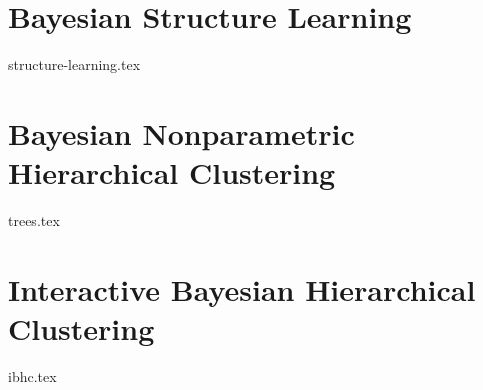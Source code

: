 \chapter{Bayesian Structure Learning}
\label{chap:structure-learning}
{structure-learning.tex}

\chapter{Bayesian Nonparametric Hierarchical Clustering}
\label{chap:bnhc}
{trees.tex}

\chapter{Interactive Bayesian Hierarchical Clustering}
\label{chap:ibhc}
{ibhc.tex}
